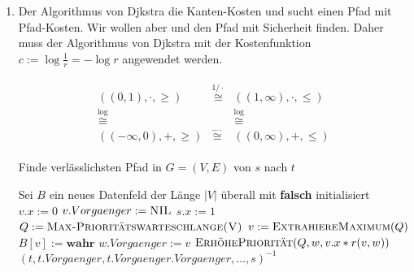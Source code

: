 \begin{solution}

\begin{enumerate}[label = \alph*]

    \item \phantom{}


    Der Algorithmus von Djkstra  die Kanten-Kosten und sucht einen Pfad mit  Pfad-Kosten.
    Wir wollen aber  und den Pfad mit  Sicherheit finden.
    Daher muss der Algorithmus von Djkstra mit der Kostenfunktion $c := \log \frac{1}{r} = -\log r$ angewendet werden.

    \begin{align*}
        \begin{matrix}
            ((0, 1), \cdot, \geq)   & \stackrel{1 / \cdot}{\cong} & ((1, \infty), \cdot, \leq) \\
            \stackrel{\log}{\cong}  &                             & \stackrel{\log}{\cong}     \\
            ((-\infty, 0), +, \geq) & \stackrel{- \cdot}{\cong}   & ((0, \infty), +, \leq)
        \end{matrix}
    \end{align*}

    \begin{algorithm}
    	\caption{Finde verlässlichsten Pfad in $G = (V, E)$ von $s$ nach $t$}
    	\begin{algorithmic}[1]
    		\State Sei $B$ ein neues Datenfeld der Länge $|V|$ überall mit \textbf{falsch} initialisiert
	    		\State $v.x := 0$
	    		\State $v.Vorgaenger := \textsc{NIL}$
    		\EndFor
    		\State $s.x := 1$
    		\State $Q := \textsc{Max-Prioritätswarteschlange(V)}$
	    		\State $v := \textsc{ExtrahiereMaximum}(Q)$
	    		\State $B[v] := \textbf{wahr}$
			    		\State $w.Vorgaenger := v$
			    		\State $\textsc{ErhöhePriorität}(Q,w,v.x \ast r(v,w))$
		    		\EndIf
	    		\EndFor
    		\EndWhile
    		\State \Return $(t, t.Vorgaenger, t.Vorgaenger.Vorgaenger, \dots, s)^{-1}$
    		\EndProcedure
    	\end{algorithmic}
    \end{algorithm}


\end{enumerate}
\end{solution}
